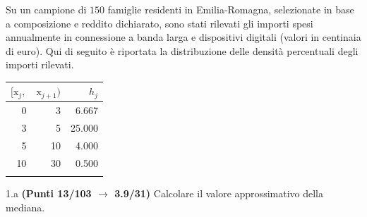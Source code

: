 \documentclass[
  11pt,
]{book}
\theoremstyle{mytheoremstyle}
\theoremstyle{mydefstyle}
\begin{document}
Su un campione di \(150\) famiglie residenti in Emilia-Romagna, selezionate in base a composizione e reddito dichiarato, sono stati rilevati gli importi spesi annualmente in connessione a banda larga e dispositivi digitali (valori in centinaia di euro). Qui di seguito è riportata la distribuzione delle densità percentuali degli importi rilevati.

\begin{table}[H]
\centering
\begin{tabular}{rrr}
\toprule
$[\text{x}_j,$ & $\text{x}_{j+1})$ & $h_j$\\
\midrule
0 & 3 & 6.667\\
3 & 5 & 25.000\\
5 & 10 & 4.000\\
10 & 30 & 0.500\\
 &  & \\
\bottomrule
\end{tabular}
\end{table}

1.a \textbf{(Punti 13/103 \(\rightarrow\) 3.9/31)} Calcolare il valore approssimativo della mediana.
\end{document}
